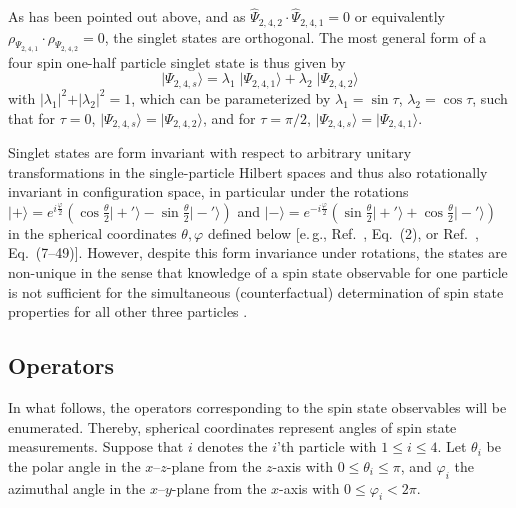 \documentclass[rmp,amsfonts,showpacs,showkeys,preprint]{revtex4}
\begin{document}
As has been pointed out above, and as $ \hat \Psi_{2,4,2}\cdot \hat \Psi_{2,4,1}=0$
or equivalently $\rho_{\Psi_{2,4,1}}\cdot \rho_{\Psi_{2,4,2}} = 0$,
the singlet states are orthogonal.
The most general form of a four spin one-half
particle singlet state is
thus given by
\begin{equation}
\vert \Psi_{2,4,s} \rangle
= \lambda_1 \;
\vert \Psi_{2,4,1} \rangle
+
\lambda_2   \;
\vert \Psi_{2,4,2} \rangle
\label{2005-hp-ep24smgf}
\end{equation}
with
$
\vert \lambda_1 \vert^2
+
\vert \lambda_2 \vert^2
=1
$,
which can be parameterized by
$\lambda_1= \sin \tau $,
$\lambda_2=\cos \tau $,
such that
for $\tau =0$,
$\vert \Psi_{2,4,s} \rangle
=
\vert \Psi_{2,4,2} \rangle
$,
and
for $\tau =\pi /2$,
$\vert \Psi_{2,4,s} \rangle
=
\vert \Psi_{2,4,1} \rangle
$.


Singlet states are form invariant with respect to arbitrary unitary
transformations in the single-particle Hilbert spaces and thus
also rotationally invariant in configuration space,
in particular under the rotations
$
\vert + \rangle =
e^{ i{\frac{\varphi}{2}} }
\left(
\cos \frac{\theta}{2} \vert +'  \rangle
-
\sin \frac{\theta}{2} \vert -'   \rangle
\right)
$
and
$
\vert - \rangle =
e^{ -i{\frac{\varphi}{2}} }
\left(
\sin \frac{\theta}{2} \vert +'   \rangle
+
\cos \frac{\theta}{2} \vert -'  \rangle
\right)
$
in the spherical coordinates $\theta , \varphi$ defined below
[e.\,g., Ref.~\cite{krenn1}, Eq.~(2), or Ref.~\cite{ba-89}, Eq.~(7--49)].
However, despite this form invariance under rotations,
the states are non-unique in the sense that knowledge
of a spin state observable for one particle is not sufficient
for the simultaneous (counterfactual) determination of
spin state properties for all other three particles
\cite{epr, svozil-2004-vax}.


\subsection{Operators}

In what follows, the operators corresponding to the spin state observables will be enumerated.
Thereby, spherical coordinates represent angles of spin state measurements.
Suppose  that $i$ denotes the $i$'th particle
with $1\le i\le 4$.
Let $\theta_i$ be the polar angle in the $x$--$z$-plane
from the $z$-axis with $0 \le \theta_i \le \pi$,
and $\varphi_i$  the azimuthal angle in the $x$--$y$-plane
from the $x$-axis with $0 \le \varphi_i < 2 \pi$.
\end{document}
